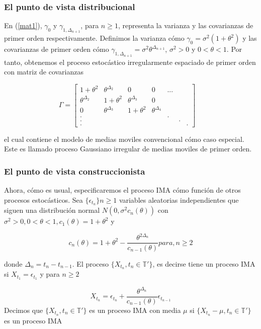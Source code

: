 \subsubsection{El punto de vista distribucional}
En (\ref{mat1}), $\gamma_0$ y $\gamma_{1,\Delta_{n+1}}$, para $n\geq1$, representa la varianza y las covarianzas 
de primer orden respectivamente. Definimos la varianza cómo $\gamma_0=\sigma^2(1+\theta^2)$ y las covarianzas de 
primer orden cómo $\gamma_{1,\Delta_{n+1}}=\sigma^2 \theta^{\Delta_{n+1}}$, $\sigma^2 >0$ y $0<\theta <1$. 
Por tanto, obtenemos el proceso estocástico irregularmente espaciado de primer orden con matriz de covarianzas

\begin{equation}
    \Gamma=
	\begin{bmatrix} 
	1+\theta^2 & \theta^{\Delta_2} & 0 & 0 & ... \\
	\theta^{\Delta_2} & 1+\theta^2 & \theta^{\Delta_3}& 0\\
	0 & \theta^{\Delta_3} & 1+\theta^2 & \theta^{\Delta_4} \\
	.& & & & . \\
	.& & & & & .\\
	. & & & & & & .
	\end{bmatrix}
	\quad
	\label{mat2}
\end{equation}

el cual contiene el modelo de medias moviles convencional cómo caso especial. Este es llamado proceso Gaussiano 
irregular de medias moviles de primer orden.

\subsubsection{El punto de vista construccionista}
Ahora, cómo es usual, especificaremos el proceso IMA cómo función de otros procesos estocásticos. 
Sea $\lbrace \epsilon_{t_n}\rbrace n\geq 1$ variables aleatorias independientes que siguen una distribución 
normal $N(0,\sigma^2 c_n(\theta))$ con $\sigma^2 >0, 0<\theta<1, c_1(\theta)=1+\theta^2$ y

$$
c_n(\theta)=1+\theta^2-\frac{\theta^{2\Delta_n}}{c_{n-1}(\theta)} para, n\geq 2
$$

donde $\Delta_n=t_n-t_{n-1}$. El proceso $\lbrace X_{t_n},t_n \in \mathbb{T'} \rbrace$, es decirse tiene un proceso 
IMA si $X_{t_1}=\epsilon_{t_1}$ y para $n\geq 2 $

\begin{equation}
    X_{t_n}= \epsilon_{t_n}+\frac{\theta^{\Delta_n}}{c_{n-1}(\theta)}\epsilon_{t_{n-1}}
\end{equation}
Decimos que $\lbrace X_{t_n},t_n \in \mathbb{T'} \rbrace$ es un proceso IMA con media 
$\mu$ si $\lbrace X_{t_n}-\mu,t_n \in \mathbb{T'} \rbrace$ es un proceso IMA